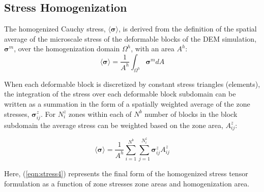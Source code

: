 \subsection{Stress Homogenization}

The homogenized Cauchy stress, $\langle\boldsymbol{\sigma}\rangle$, is derived from the definition of the spatial average of the microscale stress of the deformable blocks of the DEM simulation, $\boldsymbol{\sigma}^m$, over the homogenization domain $\Omega^{h}$, with an area $A^{h}$: 
\begin{equation}
\langle\boldsymbol{\sigma}\rangle=\frac{1}{A^{h}}\int_{\Omega^{h}}\boldsymbol{\sigma}^m dA\label{eqn:stress1}
\end{equation}






When each deformable block is discretized by constant stress triangles (elements), the integration of the stress over each deformable block subdomain can be written as a summation in the form of a spatially weighted average of the zone stresses, $\boldsymbol{\sigma}_{ij}^{z}$. For $N_{i}^{z}$ zones within each of $N^{b}$ number of blocks in the block subdomain the average stress can be weighted based on the zone area, $A_{ij}^{z}$: 

\begin{equation}
\langle\boldsymbol{\sigma}\rangle=\frac{1}{A^{h}}\sum_{i=1}^{N^{b}}\sum_{j=1}^{N_{i}^{z}}\boldsymbol{\sigma}_{ij}^{z}A_{ij}^{z}\label{eqn:stress4}
\end{equation}

Here, (\ref{eqn:stress4}) represents the final form of the homogenized stress tensor formulation as a function of zone stresses zone areas and homogenization area.